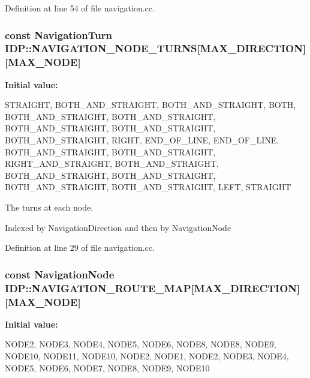 Definition at line 54 of file navigation.cc.

\hypertarget{namespaceIDP_aa117cb76acf18e6af22830d5f2468ff4}{
\subsubsection[{NAVIGATION\_\-NODE\_\-TURNS}]{\setlength{\rightskip}{0pt plus 5cm}const {\bf NavigationTurn} {\bf IDP::NAVIGATION\_\-NODE\_\-TURNS}\mbox{[}MAX\_\-DIRECTION\mbox{]}\mbox{[}MAX\_\-NODE\mbox{]}}}
\label{namespaceIDP_aa117cb76acf18e6af22830d5f2468ff4}
{\bfseries Initial value:}
\begin{DoxyCode}
 {
        {STRAIGHT, BOTH_AND_STRAIGHT, BOTH_AND_STRAIGHT, BOTH,
            BOTH_AND_STRAIGHT, BOTH_AND_STRAIGHT, BOTH_AND_STRAIGHT,
            BOTH_AND_STRAIGHT, BOTH_AND_STRAIGHT, RIGHT, END_OF_LINE},
        {END_OF_LINE, BOTH_AND_STRAIGHT, BOTH_AND_STRAIGHT, RIGHT_AND_STRAIGHT,
            BOTH_AND_STRAIGHT, BOTH_AND_STRAIGHT, BOTH_AND_STRAIGHT,
            BOTH_AND_STRAIGHT, BOTH_AND_STRAIGHT, LEFT, STRAIGHT}
    }
\end{DoxyCode}


The turns at each node. 

Indexed by NavigationDirection and then by NavigationNode 

Definition at line 29 of file navigation.cc.

\hypertarget{namespaceIDP_a33ba7fcc78e0c8e5477d2ed6ac18e48f}{
\subsubsection[{NAVIGATION\_\-ROUTE\_\-MAP}]{\setlength{\rightskip}{0pt plus 5cm}const {\bf NavigationNode} {\bf IDP::NAVIGATION\_\-ROUTE\_\-MAP}\mbox{[}MAX\_\-DIRECTION\mbox{]}\mbox{[}MAX\_\-NODE\mbox{]}}}
\label{namespaceIDP_a33ba7fcc78e0c8e5477d2ed6ac18e48f}
{\bfseries Initial value:}
\begin{DoxyCode}
 {
        {NODE2, NODE3, NODE4, NODE5, NODE6, NODE8, NODE8, NODE9, NODE10,
            NODE11, NODE10},
        {NODE2, NODE1, NODE2, NODE3, NODE4, NODE5, NODE6, NODE7, NODE8,
            NODE9, NODE10}
    }
\end{DoxyCode}


